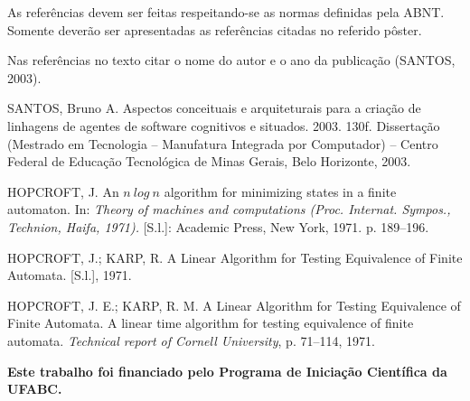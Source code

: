 \documentclass[plainsections,  36pt]{sciposter}
\begin{document}
\begin{multicols}{2}
As referências devem ser feitas respeitando-se as normas definidas pela ABNT. Somente deverão ser apresentadas as referências citadas no referido pôster.

Nas referências no texto citar o nome do autor e o ano da publicação (SANTOS, 2003).

SANTOS, Bruno A. Aspectos conceituais e arquiteturais para a criação de linhagens de agentes de software cognitivos e situados. 2003. 130f. Dissertação (Mestrado em Tecnologia – Manufatura Integrada por Computador) – Centro Federal de Educação Tecnológica de Minas Gerais, Belo Horizonte, 2003.


HOPCROFT, J. An $n~log~n$ algorithm for minimizing states in a finite automaton. In:
\textit{Theory of machines and computations (Proc. Internat. Sympos., Technion, Haifa, 1971).} [S.l.]: Academic Press, New York, 1971. p. 189–196.

HOPCROFT, J.; KARP, R. A Linear Algorithm for Testing Equivalence of Finite Automata. [S.l.], 1971.

HOPCROFT, J. E.; KARP, R. M. 
A Linear Algorithm for Testing Equivalence of Finite Automata.
A linear time algorithm for testing equivalence of finite automata. 
\textit{Technical report of Cornell University}, p. 71–114, 1971.

\vspace{1cm}
\noindent\textbf{Este trabalho foi financiado pelo Programa de Iniciação Científica da UFABC. }

\end{multicols}
\end{document}
